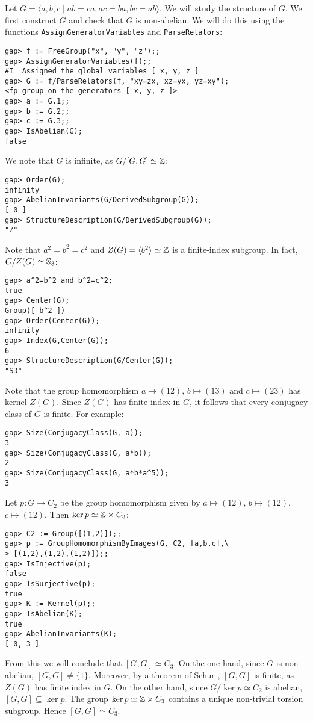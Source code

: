 \begin{example}
    Let $G=\langle a,b,c\mid ab=ca,ac=ba,bc=ab\rangle$. We will
    study the structure of $G$. 
    We first construct $G$ and check 
    that $G$ is non-abelian. We will 
    do this 
    using the functions 
    \lstinline{AssignGeneratorVariables} and
    \lstinline{ParseRelators}:
\begin{lstlisting}
gap> f := FreeGroup("x", "y", "z");;
gap> AssignGeneratorVariables(f);;
#I  Assigned the global variables [ x, y, z ]
gap> G := f/ParseRelators(f, "xy=zx, xz=yx, yz=xy");
<fp group on the generators [ x, y, z ]>
gap> a := G.1;;
gap> b := G.2;;
gap> c := G.3;;
gap> IsAbelian(G);
false
\end{lstlisting}
    We note that 
    $G$ is infinite, as $G/[G,G]\simeq\mathbb{Z}$:
\begin{lstlisting}
gap> Order(G);
infinity
gap> AbelianInvariants(G/DerivedSubgroup(G));
[ 0 ]
gap> StructureDescription(G/DerivedSubgroup(G));
"Z"
\end{lstlisting}
Note that $a^2=b^2=c^2$ and 
$Z(G)=\langle b^2\rangle\simeq\mathbb{Z}$ is a finite-index subgroup. In fact,
$G/Z(G)\simeq\mathbb{S}_3$:
\begin{lstlisting}
gap> a^2=b^2 and b^2=c^2;
true
gap> Center(G);
Group([ b^2 ])
gap> Order(Center(G));
infinity
gap> Index(G,Center(G));
6
gap> StructureDescription(G/Center(G));
"S3"
\end{lstlisting}
Note that the group homomorphism $a\mapsto (12)$, $b\mapsto (13)$ 
and $c\mapsto (23)$ 
has kernel $Z(G)$. 
Since $Z(G)$ has finite index in $G$, it follows 
that every conjugacy class of $G$ 
is finite. For example:
\begin{lstlisting}
gap> Size(ConjugacyClass(G, a));
3
gap> Size(ConjugacyClass(G, a*b));
2
gap> Size(ConjugacyClass(G, a*b*a^5));
3
\end{lstlisting}
Let $p\colon G\to C_2$ be the group homomorphism
given by $a\mapsto (12)$, $b\mapsto (12)$, $c\mapsto (12)$. 
Then $\ker p \simeq \mathbb{Z} \times C_3$: 
\begin{lstlisting}
gap> C2 := Group([(1,2)]);;
gap> p := GroupHomomorphismByImages(G, C2, [a,b,c],\ 
> [(1,2),(1,2),(1,2)]);;
gap> IsInjective(p);
false
gap> IsSurjective(p);
true
gap> K := Kernel(p);;
gap> IsAbelian(K);
true
gap> AbelianInvariants(K);
[ 0, 3 ]
\end{lstlisting}
From this we will conclude that $[G,G] \simeq C_3$. On the one hand, 
since $G$ is non-abelian, $[G,G]\ne\{1\}$.  
Moreover, by a theorem of Schur \cite[Theorem 5.7]{MR2426855}, $[G,G]$ is finite, 
as $Z(G)$ has finite index in $G$.
On the other hand, since $G/\ker p\simeq C_2$ is abelian, 
$[G,G]\subseteq \ker p$. The group $\ker p\simeq\mathbb{Z}\times C_3$ contains
a unique non-trivial torsion subgroup. Hence 
$[G,G]\simeq C_3$. 
\end{example}

